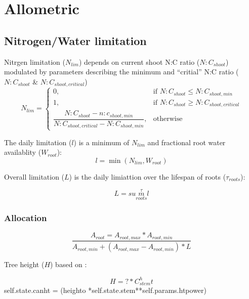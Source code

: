 \chapter{Allometric}

\section{Nitrogen/Water limitation}

Nitrgen limitation ($N_{lim}$) depends on current shoot N:C ratio ($N:C_{shoot}$) modulated by parameters describing the minimum and ``critial'' N:C ratio ($N:C_{shoot}$ \& $N:C_{shoot,critical}$)
\begin{equation}
	N_{lim}=
	\begin{cases}
	    0,& \text{if } N:C_{shoot}\le N:C_{shoot,min} \\
	    1,& \text{if } N:C_{shoot}\ge N:C_{shoot,critical} \\
	    \dfrac{N:C_{shoot} - n:c_{shoot,min}}{N:C_{shoot,critical} - N:C_{shoot,min}},& \text{otherwise}
	\end{cases}
\end{equation}

The daily limitation  ($l$) is a minimum of $N_{lim}$ and fractional root water availablity ($W_{root}$):
\begin{equation}
	l = \min (N_{lim}, W_{root})
\end{equation}

Overall limitation ($L$) is the daily limiattion over the lifespan of roots ($\tau_{roots}$):

\begin{equation}
	L = sum\limits^\tau_{roots} l
\end{equation}

\subsection{Allocation}

\begin{equation}
	\frac{A_{root}=A_{root,max}*A_{root,min}}{A_{root,min}+(A_{root,max}-A_{root,min})*L}
\end{equation}

Tree height ($H$) based on \citet{Causton1985}:

\begin{equation}
	H = ? * C_{stem} ^ ht
\end{equation}
self.state.canht = (heighto *self.state.stem**self.params.htpower)
                                
